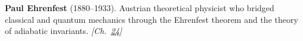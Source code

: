 \textbf{Paul Ehrenfest} (1880–1933). Austrian theoretical physicist who bridged classical and quantum mechanics through the Ehrenfest theorem and the theory of adiabatic invariants. \emph{[Ch.~\hyperref[ch:4dspacetime]{24}]}

